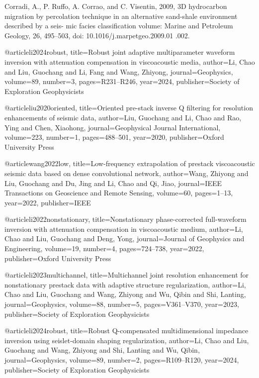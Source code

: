 Corradi, A., P. Ruffo, A. Corrao, and C. Visentin, 2009, 3{D} hydrocarbon migration by percolation technique in an alternative sand-shale environment described by a seis- mic facies classification volume: Marine and Petroleum Geology, 26, 495–503, doi: 10.1016/j.marpetgeo.2009.01 .002.



@article{li2024robust,
  title={Robust joint adaptive multiparameter waveform inversion with attenuation compensation in viscoacoustic media},
  author={Li, Chao and Liu, Guochang and Li, Fang and Wang, Zhiyong},
  journal={Geophysics},
  volume={89},
  number={3},
  pages={R231--R246},
  year={2024},
  publisher={Society of Exploration Geophysicists}
}

@article{liu2020oriented,
  title={Oriented pre-stack inverse Q filtering for resolution enhancements of seismic data},
  author={Liu, Guochang and Li, Chao and Rao, Ying and Chen, Xiaohong},
  journal={Geophysical Journal International},
  volume={223},
  number={1},
  pages={488--501},
  year={2020},
  publisher={Oxford University Press}
}

@article{wang2022low,
  title={Low-frequency extrapolation of prestack viscoacoustic seismic data based on dense convolutional network},
  author={Wang, Zhiyong and Liu, Guochang and Du, Jing and Li, Chao and Qi, Jiao},
  journal={IEEE Transactions on Geoscience and Remote Sensing},
  volume={60},
  pages={1--13},
  year={2022},
  publisher={IEEE}
}

@article{li2022nonstationary,
  title={Nonstationary phase-corrected full-waveform inversion with attenuation compensation in viscoacoustic medium},
  author={Li, Chao and Liu, Guochang and Deng, Yong},
  journal={Journal of Geophysics and Engineering},
  volume={19},
  number={4},
  pages={724--738},
  year={2022},
  publisher={Oxford University Press}
}

@article{li2023multichannel,
  title={Multichannel joint resolution enhancement for nonstationary prestack data with adaptive structure regularization},
  author={Li, Chao and Liu, Guochang and Wang, Zhiyong and Wu, Qibin and Shi, Lanting},
  journal={Geophysics},
  volume={88},
  number={5},
  pages={V361--V370},
  year={2023},
  publisher={Society of Exploration Geophysicists}
}

@article{li2024robust,
  title={Robust Q-compensated multidimensional impedance inversion using seislet-domain shaping regularization},
  author={Li, Chao and Liu, Guochang and Wang, Zhiyong and Shi, Lanting and Wu, Qibin},
  journal={Geophysics},
  volume={89},
  number={2},
  pages={R109--R120},
  year={2024},
  publisher={Society of Exploration Geophysicists}
}

